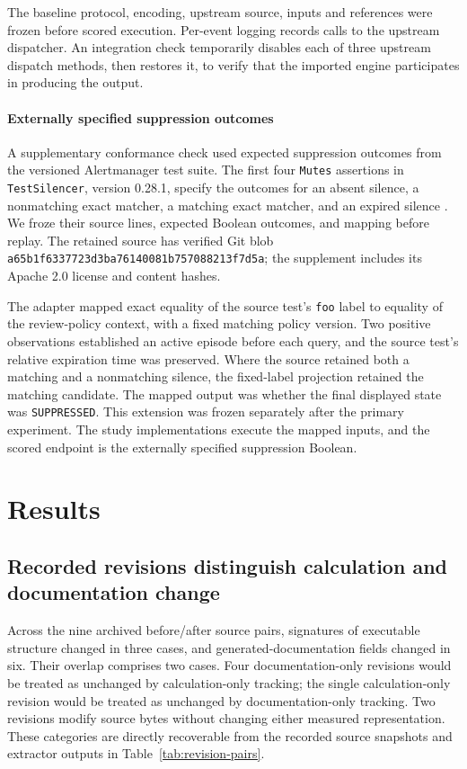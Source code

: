 \documentclass[preprint,11pt]{elsarticle}
\newcommand{\code}[1]{\texttt{#1}}
\begin{document}
The baseline protocol, encoding, upstream source, inputs and references were frozen before scored execution. Per-event logging records calls to the upstream dispatcher. An integration check temporarily disables each of three upstream dispatch methods, then restores it, to verify that the imported engine participates in producing the output.

\paragraph{Externally specified suppression outcomes}
A supplementary conformance check used expected suppression outcomes from the versioned Alertmanager test suite. The first four \code{Mutes} assertions in \code{TestSilencer}, version 0.28.1, specify the outcomes for an absent silence, a nonmatching exact matcher, a matching exact matcher, and an expired silence \cite{prometheusSilencer0281}. We froze their source lines, expected Boolean outcomes, and mapping before replay. The retained source has verified Git blob \code{a65b1f6337723d3ba76140081b757088213f7d5a}; the supplement includes its Apache 2.0 license and content hashes.

The adapter mapped exact equality of the source test's \code{foo} label to equality of the review-policy context, with a fixed matching policy version. Two positive observations established an active episode before each query, and the source test's relative expiration time was preserved. Where the source retained both a matching and a nonmatching silence, the fixed-label projection retained the matching candidate. The mapped output was whether the final displayed state was \code{SUPPRESSED}. This extension was frozen separately after the primary experiment.
The study implementations execute the mapped inputs, and the scored endpoint is the externally specified suppression Boolean.

\section{Results}
\subsection{Recorded revisions distinguish calculation and documentation change}\label{sec:revision-results}
Across the nine archived before/after source pairs, signatures of executable structure changed in three cases, and generated-documentation fields changed in six. Their overlap comprises two cases. Four documentation-only revisions would be treated as unchanged by calculation-only tracking; the single calculation-only revision would be treated as unchanged by documentation-only tracking. Two revisions modify source bytes without changing either measured representation. These categories are directly recoverable from the recorded source snapshots and extractor outputs in Table~\ref{tab:revision-pairs}.
\end{document}
